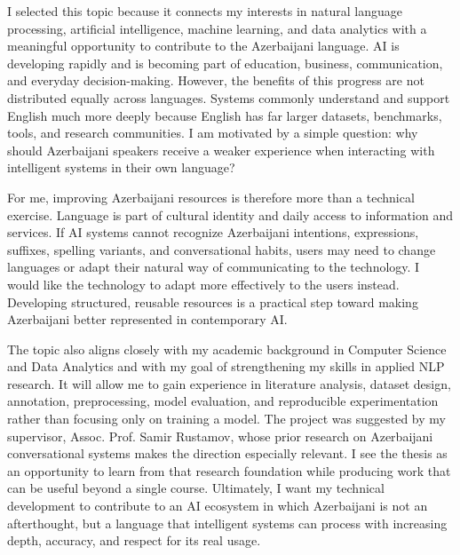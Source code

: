 \documentclass[12pt,a4paper]{article}
\begin{document}
I selected this topic because it connects my interests in natural language processing, artificial intelligence, machine learning, and data analytics with a meaningful opportunity to contribute to the Azerbaijani language. AI is developing rapidly and is becoming part of education, business, communication, and everyday decision-making. However, the benefits of this progress are not distributed equally across languages. Systems commonly understand and support English much more deeply because English has far larger datasets, benchmarks, tools, and research communities. I am motivated by a simple question: why should Azerbaijani speakers receive a weaker experience when interacting with intelligent systems in their own language?

For me, improving Azerbaijani resources is therefore more than a technical exercise. Language is part of cultural identity and daily access to information and services. If AI systems cannot recognize Azerbaijani intentions, expressions, suffixes, spelling variants, and conversational habits, users may need to change languages or adapt their natural way of communicating to the technology. I would like the technology to adapt more effectively to the users instead. Developing structured, reusable resources is a practical step toward making Azerbaijani better represented in contemporary AI.

The topic also aligns closely with my academic background in Computer Science and Data Analytics and with my goal of strengthening my skills in applied NLP research. It will allow me to gain experience in literature analysis, dataset design, annotation, preprocessing, model evaluation, and reproducible experimentation rather than focusing only on training a model. The project was suggested by my supervisor, Assoc. Prof. Samir Rustamov, whose prior research on Azerbaijani conversational systems makes the direction especially relevant. I see the thesis as an opportunity to learn from that research foundation while producing work that can be useful beyond a single course. Ultimately, I want my technical development to contribute to an AI ecosystem in which Azerbaijani is not an afterthought, but a language that intelligent systems can process with increasing depth, accuracy, and respect for its real usage.

\clearpage


\end{document}
